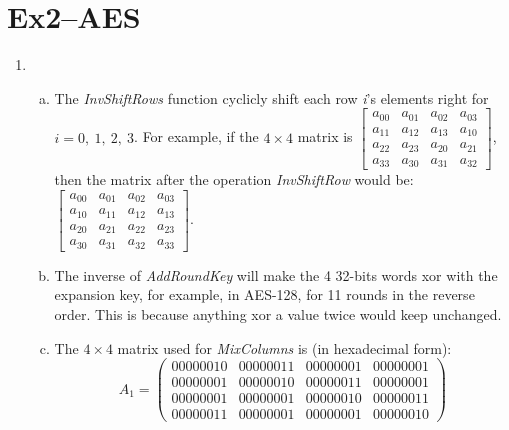\documentclass[12pt, a4paper]{article}
\begin{document}
\section{Ex2--AES}
\begin{enumerate}
    \item \begin{enumerate}[a)]
            \item The \emph{InvShiftRows} function cyclicly shift each row \emph{i}'s elements right for $i = 0,\ 1,\ 2,\ 3$.\newline
                  For example, if the $4\times 4$ matrix is 
                  $\begin{bmatrix} 
                        a_{00} & a_{01} & a_{02} & a_{03}\\
                        a_{11} & a_{12} & a_{13} & a_{10}\\
                        a_{22} & a_{23} & a_{20} & a_{21}\\
                        a_{33} & a_{30} & a_{31} & a_{32}
                  \end{bmatrix}$, then the matrix after the operation \emph{InvShiftRow} would be: 
                  $\begin{bmatrix} 
                        a_{00} & a_{01} & a_{02} & a_{03}\\
                        a_{10} & a_{11} & a_{12} & a_{13}\\
                        a_{20} & a_{21} & a_{22} & a_{23}\\
                        a_{30} & a_{31} & a_{32} & a_{33}
                  \end{bmatrix}$.
            \item The inverse of \emph{AddRoundKey} will make the 4 32-bits words xor with the expansion key, for example, 
                  in AES-128, for 11 rounds in the reverse order. This is because anything xor a value twice would keep unchanged.
            \item The $4\times 4$ matrix used for \emph{MixColumns} is (in hexadecimal form):
                  $$A_1 = 
                  \begin{pmatrix}
                        00000010 & 00000011 & 00000001 & 00000001\\
                        00000001 & 00000010 & 00000011 & 00000001\\
                        00000001 & 00000001 & 00000010 & 00000011\\
                        00000011 & 00000001 & 00000001 & 00000010

\end{pmatrix}$$
\end{enumerate}
\end{enumerate}
\end{document}
